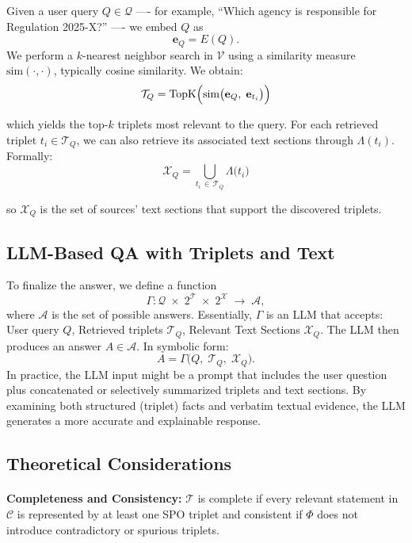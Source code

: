 \documentclass{article}
\begin{document}
Given a user query \(Q \in \mathcal{Q}\) ---- for example, ``Which agency is responsible for Regulation 2025-X?'' ---- we embed \(Q\) as
\[
\mathbf{e}_Q = E(Q).
\]
We perform a \(k\)-nearest neighbor search in \(\mathcal{V}\) using a similarity measure \(\mathrm{sim}(\cdot,\cdot)\), typically cosine similarity. We obtain:
\[
\mathcal{T}_Q = \mathrm{TopK} \Bigl(
\mathrm{sim}\bigl(\mathbf{e}_Q, \; \mathbf{e}_{t_i}\bigr) \Bigr)
\]

which yields the top-\(k\) triplets most relevant to the query. For each retrieved triplet \(t_i \in \mathcal{T}_Q\), we can also retrieve its associated text sections through \(\Lambda(t_i)\). Formally:
\[
\mathcal{X}_Q = \bigcup_{t_i \,\in\, \mathcal{T}_Q} \Lambda\bigl(t_i\bigr)
\]

so \(\mathcal{X}_Q\) is the set of sources' text sections that support the discovered triplets.

\subsection{LLM-Based QA with Triplets and Text}

To finalize the answer, we define a function
\[
\Gamma: \mathcal{Q} \;\times\; 2^{\mathcal{T}} \;\times\; 2^{\mathcal{X}}
\;\to\;
\mathcal{A},
\]
where \(\mathcal{A}\) is the set of possible answers. Essentially, \(\Gamma\) is an LLM that accepts: User query \(Q\), Retrieved triplets \(\mathcal{T}_Q\), Relevant Text Sections \(\mathcal{X}_Q\).
The LLM then produces an answer \(A \in \mathcal{A}\). In symbolic form:
\[
A = \Gamma\bigl(Q,\; \mathcal{T}_Q,\; \mathcal{X}_Q\bigr).
\]
In practice, the LLM input might be a prompt that includes the user question plus concatenated or selectively summarized triplets and text sections. By examining both structured (triplet) facts and verbatim textual evidence, the LLM generates a more accurate and explainable response.


\subsection{Theoretical Considerations}
\paragraph{}\textbf{Completeness and Consistency:} \(\mathcal{T}\) is complete if every relevant statement in \(\mathcal{C}\) is represented by at least one SPO triplet and consistent if \(\Phi\) does not introduce contradictory or spurious triplets.
\end{document}

